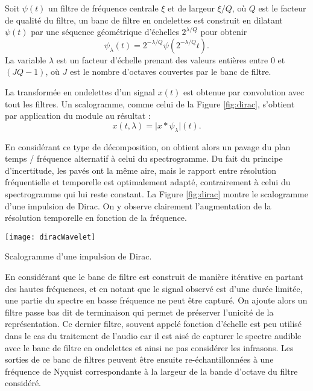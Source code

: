 
Soit ${\psi}(t)$ un filtre de fréquence centrale $\xi$ et de largeur $\xi/Q$, où $Q$ est le facteur de qualité du filtre, un banc de filtre en ondelettes est construit en dilatant
 ${\psi}(t)$ par une séquence géométrique d'échelles $2^{\lambda/Q}$ pour obtenir
\begin{equation}
{\psi_{\lambda}}(t) = 2^{-\lambda/Q} {\psi}(2^{-\lambda/Q} t)\mbox{.}
\end{equation}
La variable $\lambda$ est un facteur d'échelle prenant des valeurs entières entre $0$ et $(J Q - 1)$, où $J$ est le nombre d'octaves couvertes par le banc de filtre.

La transformée en ondelettes d'un signal
${x}(t)$ est obtenue par convolution avec tout les filtres. Un scalogramme, comme celui de la Figure \ref{fig:dirac}, s'obtient par application du module au résultat :
\begin{equation}
{x}(t, \lambda)
= \vert {x} \ast {\psi_{\lambda}} \vert (t)\mbox{.}
\end{equation}


En considérant ce type de décomposition, on obtient alors un pavage du plan temps / fréquence alternatif à celui du spectrogramme. Du fait du principe d'incertitude, les pavés ont la même aire, mais le rapport entre résolution fréquentielle et temporelle est optimalement adapté, contrairement à celui du spectrogramme qui lui reste constant. La Figure \ref{fig:dirac} montre le scalogramme d'une impulsion de Dirac. On y observe clairement l'augmentation de la résolution temporelle en fonction de la fréquence.

\begin{marginfigure}
  \texttt{[image: diracWavelet]}
  \caption{Scalogramme d'une impulsion de Dirac.}
  \label{fig:dirac}
\end{marginfigure}

En considérant que le banc de filtre est construit de manière itérative en partant des hautes fréquences, et en notant que le signal observé est d'une durée limitée, une partie du spectre en basse fréquence ne peut être capturé. On ajoute alors un filtre passe bas dit \og de terminaison \fg qui permet de préserver l'unicité de la représentation. Ce dernier filtre, souvent appelé \og fonction d'échelle \fg est peu utilisé dans le cas du traitement de l'audio car il est aisé de capturer le spectre audible avec le banc de filtre en ondelettes et ainsi ne pas considérer les infrasons. Les sorties de ce banc de filtres peuvent être ensuite re-échantillonnées à une fréquence de Nyquist correspondante à la largeur de la bande d'octave du filtre considéré.


